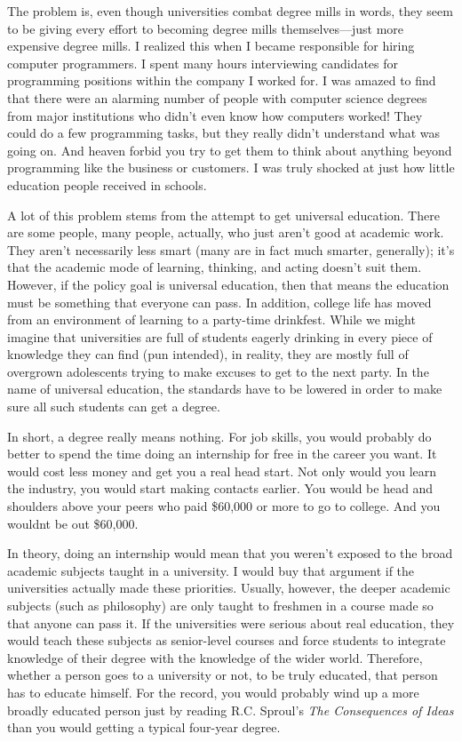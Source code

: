 The problem is, even though universities combat degree mills in words,
they seem to be giving every effort to becoming degree mills
themselves—just more expensive degree mills. I realized this when I
became responsible for hiring computer programmers. I spent many hours
interviewing candidates for programming positions within the company I
worked for. I was amazed to find that there were an alarming number of
people with computer science degrees from major institutions who didn’t
even know how computers worked!  They could do a few programming tasks,
but they really didn’t understand what was going on. And heaven forbid
you try to get them to think about anything beyond programming like the
business or customers. I was truly shocked at just how little education
people received in schools.

A lot of this problem stems from the attempt to get universal education.
There are some people, many people, actually, who just aren’t good at
academic work. They aren’t necessarily less smart (many are in fact
much smarter, generally); it’s that the academic mode of learning,
thinking, and acting doesn’t suit them. However, if the policy goal is
universal education, then that means the education must be something
that everyone can pass. In addition, college life has moved from an
environment of learning to a party-time drinkfest. While we might
imagine that universities are full of students eagerly drinking in
every piece of knowledge they can find
(pun intended), in
reality, they are
mostly full of overgrown adolescents trying to make excuses to get to
the next party. In the name of universal education, the standards have
to be lowered in order to make sure all such students can get a
degree.

In short, a degree really means nothing. For job skills, you would
probably do better to spend the time doing an internship for free in
the career you want. It would cost less money and get you a real head
start. Not only would you learn the industry, you would start making
contacts earlier. You would be head and shoulders above your peers who
paid \$60,000 or more to go to college.  And you
wouldn{\textquotesingle}t be out \$60,000.

In theory, doing an internship would mean that you weren’t exposed to
the broad academic subjects taught in a university. I would buy that
argument if the universities actually made these priorities. Usually,
however, the deeper academic subjects (such as philosophy) are only
taught to freshmen in a course made so that anyone can pass it. If the
universities were serious about real education, they would teach these
subjects as senior-level courses and force
students to integrate
knowledge of their
degree with the knowledge of the wider world. Therefore, whether
a person goes to a
university or not, to be truly educated,
that person
has to educate
himself.
For the record, you
would probably wind up a more broadly educated person just by reading
R.C. Sproul’s \textit{The Consequences of Ideas} than you would getting
a typical four-year degree. 

